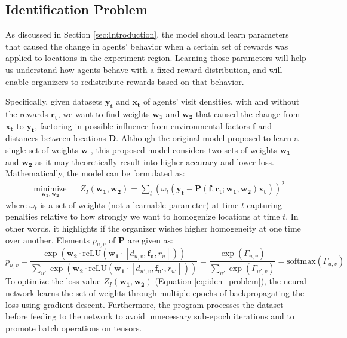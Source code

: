 \documentclass[12pt]{article}
\newcommand{\vect}[1]{\mathbf{#1}}  %
\newcommand{\matr}[1]{\mathbf{#1}}  %
\begin{document}
    \subsection{Identification Problem} \label{sec:Identification Problem}
    As discussed in Section \ref{sec:Introduction}, the model should learn parameters that caused the change in agents' behavior when a certain set of rewards was applied to locations in the experiment region. Learning those parameters will help us understand how agents behave with a fixed reward distribution, and will enable organizers to redistribute rewards based on that behavior.
    
    Specifically, given datasets $\vect{y_t}$ and $\vect{x_t}$ of agents' visit densities, with and without the rewards $\vect{r_t}$, we want to find weights $\matr{w_1}$ and $\matr{w_2}$ that caused the change from $\vect{x_t}$ to $\vect{y_t}$, factoring in possible influence from environmental factors $\matr{f}$ and distances between locations $\matr{D}$. Although the original model proposed to learn a single set of weights $\matr{w}$ \cite{Xue2016Avi2}, this proposed model considers two sets of weights $\matr{w_1}$ and $\matr{w_2}$ as it may theoretically result into higher accuracy and lower loss. Mathematically, the model can be formulated as:
    \begin{equation} \label{eq:iden_problem}
        \begin{aligned}
            & \underset{\matr{w_1}, \matr{w_2}}{\text{minimize}}
            & & Z_I(\matr{w_1}, \matr{w_2}) = \sum_{t} (\omega_t(\vect{y_t} - \matr{P}(\matr{f}, \vect{r_t}; \matr{w_1}, \matr{w_2})\vect{x_t}))^{2}
        \end{aligned}
    \end{equation}
    where $\omega_t$ is a set of weights (not a learnable parameter) at time $t$ capturing penalties relative to how strongly we want to homogenize locations at time $t$. In other words, it highlights if the organizer wishes higher homogeneity at one time over another. Elements $p_{u, v}$ of $\matr{P}$ are given as:
    \begin{equation} \label{eq:puv_equation}
    p_{u, v} = \frac{\exp(\matr{w_2} \cdot \text{reLU} (\matr{w_1} \cdot [d_{u, v}, \vect{f_{u}}, r_{u}]))}{\sum_{u'} \exp(\matr{w_2} \cdot \text{reLU} (\matr{w_1} \cdot [d_{u', v}, \vect{f_{u'}}, r_{u'}]))} = \frac{\exp(\Gamma_{u, v})}{\sum_{u'}\exp(\Gamma_{u', v})} = \text{softmax}(\Gamma_{u, v})
    \end{equation}
    To optimize the loss value $Z_I(\matr{w_1}, \matr{w_2})$ (Equation \ref{eq:iden_problem}), the neural network learns the set of weights through multiple epochs of backpropagating the loss using gradient descent. Furthermore, the program processes the dataset before feeding to the network to avoid unnecessary sub-epoch iterations and to promote batch operations on tensors. 
    
\end{document}
